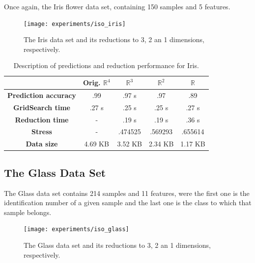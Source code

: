 Once again, the Iris flower data set, containing 150 samples and 5 features.

\begin{figure}[H]
	\centering
	\texttt{[image: experiments/iso\_iris]}
	\captionsetup{justification=centering}
	\caption{The Iris data set and its reductions to 3, 2 an 1 dimensions, respectively.}
\end{figure}

\begin{table}[H]
	\centering
	\begin{tabular}{|c|c|c|c|c|}
		\hline
		& \textbf{Orig. $\mathbb{R}^4$} & \textbf{$\mathbb{R}^3$} & \textbf{$\mathbb{R}^2$} & \textbf{$\mathbb{R}$} \\\hline
		\textbf{Prediction accuracy}   & .99      & .97  s             & .97             & .89           \\\hline
		\textbf{GridSearch time}           & .27 s   & .25 s              & .25 s         & .27 s        \\\hline
		\textbf{Reduction time}             & -           & .19 s              & .19 s          & .36 s        \\\hline
		\textbf{Stress}                                  & -           & .474525      & .569293   & .655614 \\\hline
		\textbf{Data size}                           & 4.69 KB & 3.52 KB  & 2.34 KB   & 1.17 KB  \\\hline
	\end{tabular}
	
	\caption{Description of predictions and reduction performance for Iris.}
\end{table}

\newpage
\subsection{The Glass Data Set}

The Glass data set contains 214 samples and 11 features, were the first one is the identification number of a given sample and the last one is the class to which that sample belongs.

\begin{figure}[H]
	\centering
	\texttt{[image: experiments/iso\_glass]}
	\captionsetup{justification=centering}
	\caption{The Glass data set and its reductions to 3, 2 an 1 dimensions, respectively.}
\end{figure}

